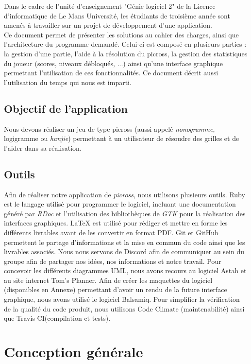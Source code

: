 \documentclass{report}
\begin{document}
		Dans le cadre de l'unité d'enseignement "Génie logiciel 2" de la Licence d'informatique de Le Mans Université, les étudiants de troisième année sont amenés à travailler sur un projet de développement d'une application. \\
		Ce document permet de présenter les solutions au cahier des charges, ainsi que l'architecture du programme demandé. Celui-ci est composé en plusieurs parties : la gestion d'une partie, l'aide à la résolution du picross, la gestion des statistiques du joueur (scores, niveaux débloqués, ...) ainsi qu'une interface graphique permettant l'utilisation de ces fonctionnalités. Ce document décrit aussi l'utilisation du temps qui nous est imparti. 

	
 	\section{Objectif de l'application}		
		Nous devons réaliser un jeu de type picross (aussi appelé \textit{nonogramme}, logigramme ou \textit{hanjie}) permettant à un utilisateur de résoudre des grilles et de l'aider dans sa réalisation.
		
	\section{Outils}
		
		Afin de réaliser notre application de \textit{picross}, nous utilisons plusieurs outils. Ruby est le langage utilisé pour programmer le logiciel, incluant une documentation généré par \textit{RDoc} et l'utilisation des bibliothèques de \textit{GTK} pour la réalisation des interfaces graphiques.
LaTeX est utilisé pour rédiger et mettre en forme les différents livrables avant de les convertir en format PDF.
Git et GitHub permettent le partage d'informations et la mise en commun du code ainsi que les livrables associés. Nous nous servons de Discord afin de communiquer au sein du groupe afin de partager nos idées, nos informations et notre travail.
Pour concevoir les différents diagrammes UML, nous avons recours au logiciel Astah et au site internet Tom's Planner.
Afin de créer les maquettes du logiciel (disponibles en Annexe) permettant d’avoir un rendu de la future interface graphique, nous avons utilisé le logiciel Balsamiq.
Pour simplifier la vérification de la qualité du code produit, nous utilisons Code Climate (maintenabilité) ainsi que Travis CI(compilation et tests).

		
\chapter{Conception générale}
\end{document}
